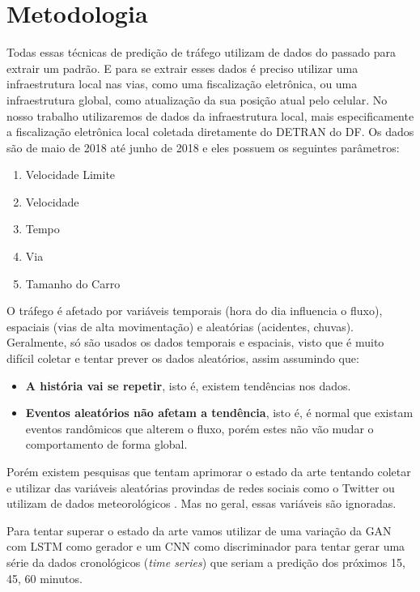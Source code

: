 \section{Metodologia}

Todas essas técnicas de predição de tráfego utilizam de dados do passado para extrair um padrão. E para se extrair esses dados é preciso utilizar uma infraestrutura local nas vias, como uma fiscalização eletrônica, ou uma infraestrutura global, como atualização da sua posição atual pelo celular. No nosso trabalho utilizaremos de dados da infraestrutura local, mais especificamente a fiscalização eletrônica local coletada diretamente do \acrfull{DETRAN} do \acrfull{DF}. Os dados são de maio de 2018 até junho de 2018 e eles possuem os seguintes parâmetros:
\begin{enumerate}
    \item Velocidade Limite
    \item Velocidade
    \item Tempo
    \item Via
    \item Tamanho do Carro
\end{enumerate}

O tráfego é afetado por variáveis temporais (hora do dia influencia o fluxo), espaciais (vias de alta movimentação) e aleatórias (acidentes, chuvas). Geralmente, só são usados os dados temporais e espaciais, visto que é muito difícil coletar e tentar prever os dados aleatórios, assim assumindo que:
\begin{itemize}
    \item \textbf{A história vai se repetir}, isto é, existem tendências nos dados.
    \item \textbf{Eventos aleatórios não afetam a tendência}, isto é, é normal que existam eventos randômicos que alterem o fluxo, porém estes não vão mudar o comportamento de forma global.
\end{itemize}

Porém existem pesquisas que tentam aprimorar o estado da arte tentando coletar e utilizar das variáveis aleatórias provindas de redes sociais como o Twitter \cite{he2013improving} ou utilizam de dados meteorológicos \cite{wang_2018}. Mas no geral, essas variáveis são ignoradas.

Para tentar superar o estado da arte vamos utilizar de uma variação da \acrshort{GAN} com \acrshort{LSTM} como gerador e um \acrshort{CNN} como discriminador para tentar gerar uma série da dados cronológicos (\textit{time series}) que seriam a predição dos próximos 15, 45, 60 minutos.

